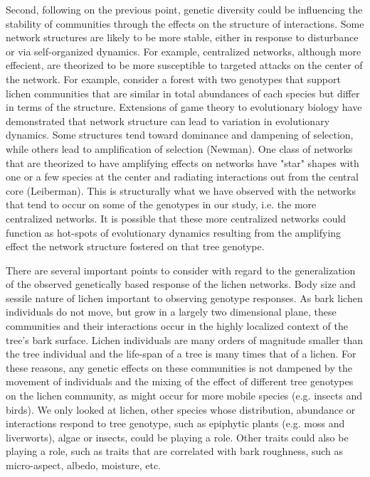 \documentclass[11pt,twocolumn,twoside,lineno]{pnas-new}
\begin{document}
Second, following on the previous point, genetic diversity could be
influencing the stability of communities through the effects on the
structure of interactions. Some network structures are likely to be
more stable, either in response to disturbance or via self-organized
dynamics. For example, centralized networks, although more effecient,
are theorized to be more susceptible to targeted attacks on the center
of the network. For example, consider a forest with two genotypes that
support lichen communities that are similar in total abundances of
each species but differ in terms of the structure. Extensions of game
theory to evolutionary biology have demonstrated that network
structure can lead to variation in evolutionary dynamics. Some
structures tend toward dominance and dampening of selection, while
others lead to amplification of selection (Newman). One class of
networks that are theorized to have amplifying effects on networks
have "star" shapes with one or a few species at the center and
radiating interactions out from the central core (Leiberman). This is
structurally what we have observed with the networks that tend to
occur on some of the genotypes in our study, i.e. the more centralized
networks. It is possible that these more centralized networks could
function as hot-spots of evolutionary dynamics resulting from the
amplifying effect the network structure fostered on that tree
genotype.

There are several important points to consider with regard to the
generalization of the observed genetically based response of the
lichen networks. Body size and sessile nature of lichen important to
observing genotype responses. As bark lichen individuals do not move,
but grow in a largely two dimensional plane, these communities and
their interactions occur in the highly localized context of the tree's
bark surface. Lichen individuals are many orders of magnitude smaller
than the tree individual and the life-span of a tree is many times
that of a lichen. For these reasons, any genetic effects on these
communities is not dampened by the movement of individuals and the
mixing of the effect of different tree genotypes on the lichen
community, as might occur for more mobile species (e.g. insects and
birds). We only looked at lichen, other species whose distribution,
abundance or interactions respond to tree genotype, such as epiphytic
plants (e.g. moss and liverworts), algae or insects, could be playing
a role. Other traits could also be playing a role, such as traits that
are correlated with bark roughness, such as micro-aspect, albedo,
moisture, etc.
\end{document}
